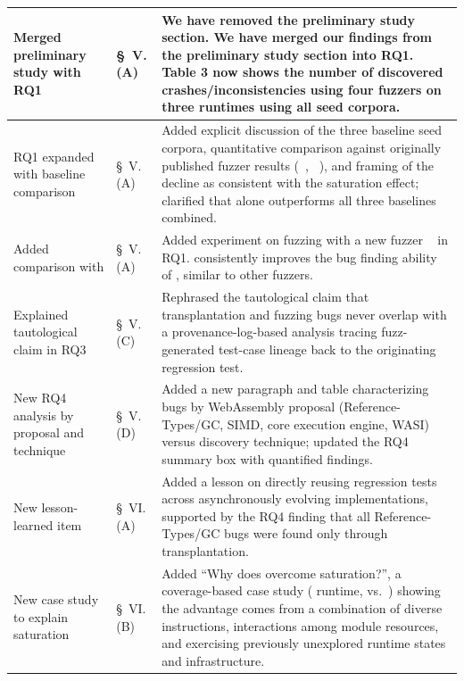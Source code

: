 \documentclass[11pt]{article}
\begin{document}
\begin{table}[!h]
\begin{tabular}{|>{\raggedright\arraybackslash}m{2.7cm}|>{\centering\arraybackslash}m{2.2cm}|>{\raggedright\arraybackslash}m{10cm}|}
Merged preliminary study with RQ1 &
\S~V.(A) &
We have removed the preliminary study section. We have merged our findings from the preliminary study section into RQ1. Table 3 now shows the number of discovered crashes/inconsistencies using four fuzzers on three runtimes using all seed corpora. \\
\hline

RQ1 expanded with baseline comparison &
\S~V.(A) &
Added explicit discussion of the three baseline seed corpora, quantitative comparison against originally published fuzzer results (\wapplique{}~\cite{zhao2024wapplique}, \wasmaker{}~\cite{cao2024wasmaker}), and framing of the decline as consistent with the saturation effect; clarified that \rtbench{} alone outperforms all three baselines combined. \\
\hline

Added comparison with \lwdiff{} &
\S~V.(A) &
Added experiment on fuzzing with a new fuzzer \lwdiff{}~\cite{zhou2025lwdiff} in RQ1. \rtbench{} consistently improves the bug finding ability of \lwdiff{}, similar to other fuzzers. \\
\hline

Explained tautological claim in RQ3 &
\S~V.(C) &
Rephrased the tautological claim that transplantation and fuzzing bugs never overlap with a provenance-log-based analysis tracing fuzz-generated test-case lineage back to the originating regression test. \\
\hline

New RQ4 analysis by proposal and technique &
\S~V.(D) &
Added a new paragraph and table characterizing bugs by WebAssembly proposal (Reference-Types/GC, SIMD, core execution engine, WASI) versus discovery technique; updated the RQ4 summary box with quantified findings. \\
\hline

New lesson-learned item &
\S~VI.(A) &
Added a lesson on directly reusing regression tests across asynchronously evolving implementations, supported by the RQ4 finding that all Reference-Types/GC bugs were found only through transplantation. \\
\hline

New case study to explain saturation &
\S~VI.(B) &
Added ``Why does \rtbench{} overcome saturation?'', a coverage-based case study (\wasmer{} runtime, \rtbench{} vs.\ \wasmbench{}) showing the advantage comes from a combination of diverse instructions, interactions among module resources, and exercising previously unexplored runtime states and infrastructure. \\
\hline


\end{tabular}
\end{table}
\end{document}
